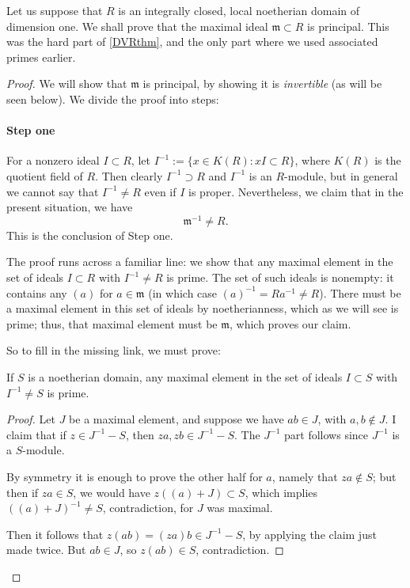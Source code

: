 Let us suppose that $R$ is an integrally closed, local noetherian domain of
dimension one. We shall prove that the maximal ideal $\mathfrak{m} \subset R$
is principal. This was the hard part of \cref{DVRthm}, and the only part
where we used associated primes earlier.
\begin{proof}
We will show that $\mathfrak{m}$ is principal, by showing it is \emph{invertible} (as will be seen below).   We divide the proof into steps:

\paragraph{Step one}
For a nonzero ideal $I \subset R$, let $I^{-1} := \{ x \in K(R): xI \subset R \}$,
where $K(R)$ is the quotient field of $R$.  Then clearly $I^{-1} \supset R$
and $I^{-1}$ is an $R$-module, but in general we cannot say that $I^{-1} \neq
R$ even if $I$ is proper.  
Nevertheless, we claim that in the present situation, we have  \[
{\mathfrak{m}^{-1} \neq R.}\] This is the conclusion of Step one.

The proof runs across a familiar line: we show that any maximal element in the
set of ideals $I \subset R$ with $I^{-1} \neq R$ is prime. 
The set of such ideals is nonempty: it contains   any $(a)$ for $a \in \mathfrak{m}$ (in which case $(a)^{-1} = Ra^{-1} \neq R$).  
There must be a maximal element in this set of ideals by noetherianness, which
as we will see is prime; thus,  that maximal element must be $\mathfrak{m}$, which proves our claim.

So to fill in the missing link, we must prove:
\begin{lemma} If $S$ is a noetherian domain, any maximal element in the set of ideals $I \subset S$ with $I^{-1} \neq S$ is prime.
\end{lemma}

\begin{proof}
Let $J$ be a maximal element, and suppose we have $ab \in J$, with  $a,b \notin J$.  I claim that if $z \in J^{-1} - S$, then $za, zb \in J^{-1} - S$.  The $J^{-1}$ part follows since $J^{-1}$ is a $S$-module.

By symmetry it is enough to prove the other half for $a$, namely that $za \notin
S$; but then if $za \in S$, we would have $z( (a) + J ) \subset S$, which implies $ ( (a) + J)^{-1} \neq S$, contradiction, for $J$ was maximal.

Then it follows that $z(ab) = (za) b \in J^{-1} - S$, by applying the claim  just made twice.  But $ab \in J$, so $z(ab) \in S$, contradiction.
\end{proof}




\end{proof}
